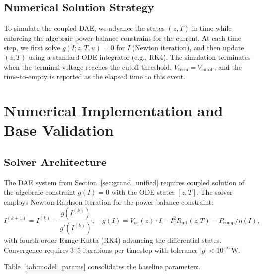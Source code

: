 \documentclass{mcmthesis}
\begin{document}
\subsection{Numerical Solution Strategy}
To simulate the coupled DAE, we advance the states $(z,T)$ in time while enforcing the algebraic power-balance constraint for the current. At each time step, we first solve $g(I;z,T,u)=0$ for $I$ (Newton iteration), and then update $(z,T)$ using a standard ODE integrator (e.g., RK4). The simulation terminates when the terminal voltage reaches the cutoff threshold, $V_{\mathrm{term}}=V_{\mathrm{cutoff}}$, and the time-to-empty is reported as the elapsed time to this event.


\section{Numerical Implementation and Base Validation}
\label{sec:numerical_impl}

\subsection{Solver Architecture}

The DAE system from Section~\ref{sec:grand_unified} requires coupled solution of the algebraic constraint $g(I) = 0$ with the ODE states $[z, T]$. The solver employs Newton-Raphson iteration for the power balance constraint:
\begin{equation}
  I^{(k+1)} = I^{(k)} - \frac{g(I^{(k)})}{g'(I^{(k)})}, \quad
  g(I) = V_{\mathrm{oc}}(z) \cdot I - I^2 R_{\mathrm{int}}(z,T) - P_{\mathrm{comp}}/\eta(I),
  \label{eq:newton_raphson}
\end{equation}
with fourth-order Runge-Kutta (RK4) advancing the differential states. Convergence requires 3--5 iterations per timestep with tolerance $|g| < 10^{-6}$\,W.

Table~\ref{tab:model_params} consolidates the baseline parameters.
\end{document}
